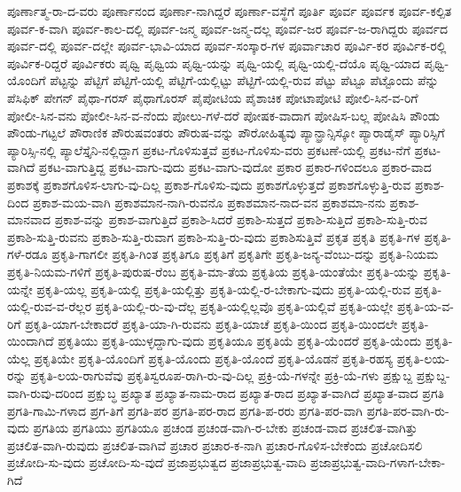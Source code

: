 {ಪೂರ್ಣಾತ್ಮ-ರಾ-ದ-ವರು
ಪೂರ್ಣಾನಂದ
ಪೂರ್ಣಾ-ನಾಗಿದ್ದರೆ
ಪೂರ್ಣಾ-ವಸ್ಥೆಗೆ
ಪೂರ್ತಿ
ಪೂರ್ವ
ಪೂರ್ವಕ
ಪೂರ್ವ-ಕಲ್ಪಿತ
ಪೂರ್ವ-ಕ-ವಾಗಿ
ಪೂರ್ವ-ಕಾಲ-ದಲ್ಲಿ
ಪೂರ್ವ-ಜನ್ಮ
ಪೂರ್ವ-ಜನ್ಮ-ದಲ್ಲ
ಪೂರ್ವ-ಜರ
ಪೂರ್ವ-ಜ-ರಾಗಿದ್ದರು
ಪೂರ್ವದ
ಪೂರ್ವ-ದಲ್ಲಿ
ಪೂರ್ವ-ದಲ್ಲೇ
ಪೂರ್ವ-ಭಾವಿ-ಯಾದ
ಪೂರ್ವ-ಸಂಸ್ಕಾರ-ಗಳ
ಪೂರ್ವಾಚಾರ
ಪೂರ್ವಿ-ಕರ
ಪೂರ್ವಿಕ-ರಲ್ಲಿ
ಪೂರ್ವಿಕ-ರಿದ್ದರೆ
ಪೂರ್ವಿಕರು
ಪೃಥ್ವಿ
ಪೃಥ್ವಿಯ
ಪೃಥ್ವಿ-ಯನ್ನು
ಪೃಥ್ವಿ-ಯಲ್ಲಿ
ಪೃಥ್ವಿ-ಯಲ್ಲಿ-ದೆಯೊ
ಪೃಥ್ವಿ-ಯಾದ
ಪೃಥ್ವಿ-ಯೊಂದಿಗೆ
ಪೆಟ್ಟನ್ನು
ಪೆಟ್ಟಿಗೆ
ಪೆಟ್ಟಿಗೆ-ಯಲ್ಲಿ
ಪೆಟ್ಟಿಗೆ-ಯಲ್ಲಿಟ್ಟು
ಪೆಟ್ಟಿಗೆ-ಯಲ್ಲಿ-ರುವ
ಪೆಟ್ಟು
ಪೆಟ್ಟೂ
ಪೆಟ್ಟೊಂದು
ಪೆನ್ನು
ಪೆಸಿಫಿಕ್
ಪೇಗನ್
ಪೈಥಾ-ಗರಸ್
ಪೈಥಾಗೊರಸ್
ಪೈಪೋಟಿಯ
ಪೈಶಾಚಿಕ
ಪೋಟಾಪೋಟಿ
ಪೋಲಿ-ಸಿನ-ವ-ರಿಗೆ
ಪೋಲೀ-ಸಿನ-ವನು
ಪೋಲೀ-ಸಿನ-ವ-ನೆಂದು
ಪೋಲು-ಗಳೆ-ದರೆ
ಪೋಷಕ-ವಾದಾಗ
ಪೋಷಿಸ-ಬಲ್ಲ
ಪೋಷಿಸಿ
ಪೌಂಡು
ಪೌಂಡು-ಗಟ್ಟಲೆ
ಪೌರಾಣಿಕ
ಪೌರುಷವಂತರು
ಪೌರುಷ-ವನ್ನು
ಪೌರೋಹಿತ್ಯವು
ಪ್ಯಾನ್ಫ್ರಾನ್ಸಿಸ್ಕೋ
ಪ್ಯಾರಾಡೈಸ್
ಪ್ಯಾರಿಸ್ಸಿಗೆ
ಪ್ಯಾರಿಸ್ಸಿ-ನಲ್ಲಿ
ಪ್ಯಾಲೆಸ್ತೈನಿ-ನಲ್ಲಿದ್ದಾಗ
ಪ್ರಕಟ-ಗೊಳಿಸುತ್ತವೆ
ಪ್ರಕಟ-ಗೊಳಿಸು-ವರು
ಪ್ರಕಟಣೆ-ಯಲ್ಲಿ
ಪ್ರಕಟ-ನೆಗೆ
ಪ್ರಕಟ-ವಾಗಿದೆ
ಪ್ರಕಟ-ವಾಗುತ್ತಿದ್ದ
ಪ್ರಕಟ-ವಾಗು-ವುದು
ಪ್ರಕಟ-ವಾಗು-ವುದೋ
ಪ್ರಕಾರ
ಪ್ರಕಾರ-ಗಳಿಂದಲೂ
ಪ್ರಕಾರ-ವಾದ
ಪ್ರಕಾಶಕ್ಕೆ
ಪ್ರಕಾಶಗೊಳಿಸ-ಲಾಗು-ವು-ದಿಲ್ಲ
ಪ್ರಕಾಶ-ಗೊಳಿಸು-ವುದು
ಪ್ರಕಾಶಗೊಳ್ಳುತ್ತದೆ
ಪ್ರಕಾಶಗೊಳ್ಳುತ್ತಿ-ರುವ
ಪ್ರಕಾಶ-ದಿಂದ
ಪ್ರಕಾಶ-ಮಯ-ವಾಗಿ
ಪ್ರಕಾಶಮಾನ-ನಾಗಿ-ರುವನೊ
ಪ್ರಕಾಶಮಾನ-ನಾದ-ವನ
ಪ್ರಕಾಶಮಾ-ನನು
ಪ್ರಕಾಶ-ಮಾನವಾದ
ಪ್ರಕಾಶ-ವನ್ನು
ಪ್ರಕಾಶ-ವಾಗುತ್ತಿದೆ
ಪ್ರಕಾಶಿ-ಸಿದರೆ
ಪ್ರಕಾಶಿ-ಸುತ್ತದೆ
ಪ್ರಕಾಶಿ-ಸುತ್ತಿದೆ
ಪ್ರಕಾಶಿ-ಸುತ್ತಿ-ರುವ
ಪ್ರಕಾಶಿ-ಸುತ್ತಿ-ರುವನು
ಪ್ರಕಾಶಿ-ಸುತ್ತಿ-ರುವಾಗ
ಪ್ರಕಾಶಿ-ಸುತ್ತಿ-ರು-ವುದು
ಪ್ರಕಾಶಿಸುತ್ತಿವೆ
ಪ್ರಕೃತ
ಪ್ರಕೃತಿ
ಪ್ರಕೃತಿ-ಗಳ
ಪ್ರಕೃತಿ-ಗಳೆ-ರಡೂ
ಪ್ರಕೃತಿ-ಗಾಗಲೀ
ಪ್ರಕೃತಿ-ಗಿಂತ
ಪ್ರಕೃತಿಗೂ
ಪ್ರಕೃತಿಗೆ
ಪ್ರಕೃತಿಗೇ
ಪ್ರಕೃತಿ-ಜನ್ಯ-ವೆಂಬು-ದನ್ನು
ಪ್ರಕೃತಿ-ನಿಯಮ
ಪ್ರಕೃತಿ-ನಿಯಮ-ಗಳಿಗೆ
ಪ್ರಕೃತಿ-ಪುರುಷ-ರೆಂಬ
ಪ್ರಕೃತಿ-ಮಾ-ತೆಯ
ಪ್ರಕೃತಿಯ
ಪ್ರಕೃತಿ-ಯಂತೆಯೇ
ಪ್ರಕೃತಿ-ಯನ್ನು
ಪ್ರಕೃತಿ-ಯನ್ನೇ
ಪ್ರಕೃತಿ-ಯಲ್ಲ
ಪ್ರಕೃತಿ-ಯಲ್ಲಿ
ಪ್ರಕೃತಿ-ಯಲ್ಲಿತ್ತು
ಪ್ರಕೃತಿ-ಯಲ್ಲಿ-ರ-ಬೇಕಾಗು-ವುದು
ಪ್ರಕೃತಿ-ಯಲ್ಲಿ-ರುವ
ಪ್ರಕೃತಿ-ಯಲ್ಲಿ-ರುವ-ವ-ರೆಲ್ಲರ
ಪ್ರಕೃತಿ-ಯಲ್ಲಿ-ರು-ವು-ದೆಲ್ಲ
ಪ್ರಕೃತಿ-ಯಲ್ಲಿಲ್ಲವೊ
ಪ್ರಕೃತಿ-ಯಲ್ಲಿವೆ
ಪ್ರಕೃತಿ-ಯಲ್ಲೇ
ಪ್ರಕೃತಿ-ಯ-ವ-ರಿಗೆ
ಪ್ರಕೃತಿ-ಯಾಗ-ಬೇಕಾದರೆ
ಪ್ರಕೃತಿ-ಯಾ-ಗಿ-ರುವನು
ಪ್ರಕೃತಿ-ಯಾಚೆ
ಪ್ರಕೃತಿ-ಯಿಂದ
ಪ್ರಕೃತಿ-ಯಿಂದಲೇ
ಪ್ರಕೃತಿ-ಯಿಂದಾಗಿದೆ
ಪ್ರಕೃತಿಯು
ಪ್ರಕೃತಿ-ಯುಳ್ಳದ್ದಾಗು-ವುದು
ಪ್ರಕೃತಿಯೂ
ಪ್ರಕೃತಿಯೆ
ಪ್ರಕೃತಿ-ಯೆಂದರೆ
ಪ್ರಕೃತಿ-ಯೆಂದು
ಪ್ರಕೃತಿ-ಯೆಲ್ಲ
ಪ್ರಕೃತಿಯೇ
ಪ್ರಕೃತಿ-ಯೊಂದಿಗೆ
ಪ್ರಕೃತಿ-ಯೊಂದು
ಪ್ರಕೃತಿ-ಯೊಂದೆ
ಪ್ರಕೃತಿ-ಯೊಡನೆ
ಪ್ರಕೃತಿ-ರಹಸ್ಯ
ಪ್ರಕೃತಿ-ಲಯ-ರನ್ನು
ಪ್ರಕೃತಿ-ಲಯ-ರಾಗುವೆವು
ಪ್ರಕೃತಿಸ್ವರೂಪ-ರಾಗಿ-ರು-ವು-ದಿಲ್ಲ
ಪ್ರಕ್ರಿ-ಯೆ-ಗಳನ್ನೇ
ಪ್ರಕ್ರಿ-ಯೆ-ಗಳು
ಪ್ರಕ್ಷುಬ್ದ
ಪ್ರಕ್ಷುಬ್ದ-ವಾಗಿ-ರುವು-ದರಿಂದ
ಪ್ರಕ್ಷುಬ್ಧ
ಪ್ರಖ್ಯಾತ
ಪ್ರಖ್ಯಾತ-ನಾಮ-ರಾದ
ಪ್ರಖ್ಯಾತ-ರಾದ
ಪ್ರಖ್ಯಾತ-ವಾಗಿದೆ
ಪ್ರಖ್ಯಾತ-ವಾದ
ಪ್ರಗತಿ
ಪ್ರಗತಿ-ಗಾಮಿ-ಗಳಾದ
ಪ್ರಗ-ತಿಗೆ
ಪ್ರಗತಿ-ಪರ
ಪ್ರಗತಿ-ಪರ-ರಾದ
ಪ್ರಗತಿ-ಪ-ರರು
ಪ್ರಗತಿ-ಪರ-ವಾಗಿ
ಪ್ರಗತಿ-ಪರ-ವಾಗಿ-ರು-ವುದು
ಪ್ರಗತಿಯ
ಪ್ರಗತಿಯು
ಪ್ರಗತಿಯೂ
ಪ್ರಚಂಡ
ಪ್ರಚಂಡ-ವಾಗಿ-ರ-ಬೇಕು
ಪ್ರಚಂಡ-ವಾದ
ಪ್ರಚಲಿತ-ವಾಗಿತ್ತು
ಪ್ರಚಲಿತ-ವಾಗಿ-ರುವುದು
ಪ್ರಚಲಿತ-ವಾಗಿವೆ
ಪ್ರಚಾರ
ಪ್ರಚಾರ-ಕ-ನಾಗಿ
ಪ್ರಚಾರ-ಗೊಳಿಸ-ಬೇಕೆಂದು
ಪ್ರಚೋದಿಸಲಿ
ಪ್ರಚೋದಿ-ಸು-ವುದು
ಪ್ರಚೋದಿ-ಸು-ವುದೆ
ಪ್ರಜಾಪ್ರಭುತ್ವದ
ಪ್ರಜಾಪ್ರಭುತ್ವ-ವಾದಿ
ಪ್ರಜಾಪ್ರಭುತ್ವ-ವಾದಿ-ಗಳಾಗ-ಬೇಕಾ-ಗಿದೆ
}
